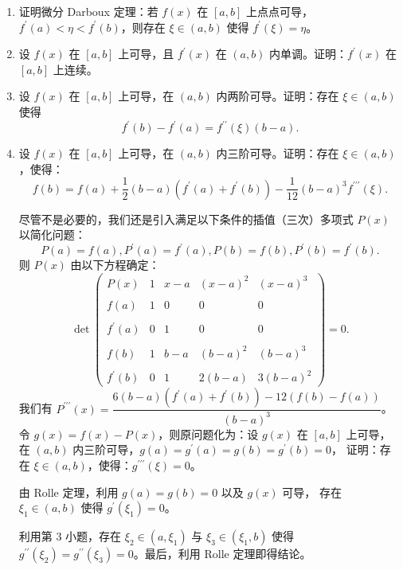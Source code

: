 \begin{enumerate}
\item 证明微分 Darboux 定理：若 $f(x)$ 在 $[a, b]$ 上点点可导，$f^{\prime}(a)<\eta<f^{\prime}(b)$，则存在 $\xi \in(a, b)$ 使得 $f^{\prime}(\xi)=\eta$。
\item 设 $f(x)$ 在 $[a, b]$ 上可导，且 $f^{\prime}(x)$ 在 $(a, b)$ 内单调。证明：$f^{\prime}(x)$ 在 $[a, b]$ 上连续。
\item 设 $f(x)$ 在 $[a, b]$ 上可导，在 $(a, b)$ 内两阶可导。证明：存在 $\xi \in(a, b)$ 使得
\[f^{\prime}(b)-f^{\prime}(a)=f^{\prime \prime}(\xi)(b-a).\]
\item 设 $f(x)$ 在 $[a, b]$ 上可导，在 $(a, b)$ 内三阶可导。证明：存在 $\xi \in(a, b)$，使得：
\[f(b)=f(a)+\frac{1}{2}(b-a)(f^{\prime}(a)+f^{\prime}(b))
-\frac{1}{12}(b-a)^{3}f^{\prime \prime \prime}(\xi).\]
\begin{proofc}[4 的证明]
尽管不是必要的，我们还是引入满足以下条件的插值（三次）多项式 $P(x)$ 以简化问题：
\[P(a)=f(a), P^{\prime}(a)=f^{\prime}(a), 
P(b)=f(b), P^{\prime}(b)=f^{\prime}(b).\]
则 $P(x)$ 由以下方程确定：
\[\det\begin{pmatrix}
P(x) & 1 & x-a & (x-a)^{2} & (x-a)^{3} \\ \\
f(a) & 1 & 0 & 0 & 0 \\ \\
f^{\prime}(a) & 0 & 1 & 0 & 0 \\ \\
f(b) & 1 & b-a & (b-a)^{2} & (b-a)^{3} \\ \\
f^{\prime}(b) & 0 & 1 & 2(b-a) & 3(b-a)^{2}
\end{pmatrix}=0.\]
我们有 $P^{\prime \prime \prime}(x)=\dfrac{6(b-a)(f^{\prime}(a)+f^{\prime}(b))-12(f(b)-f(a))}{(b-a)^{3}}$。
令 $g(x)=f(x)-P(x)$，则原问题化为：设 $g(x)$ 在 $[a, b]$ 上可导，
在 $(a, b)$ 内三阶可导，$g(a)=g^{\prime}(a)=g(b)=g^{\prime}(b)=0$，
证明：存在 $\xi \in(a, b)$，使得：$g^{\prime \prime \prime}(\xi)=0$。

由 Rolle 定理，利用 $g(a)=g(b)=0$ 以及 $g(x)$ 可导，
存在 $\xi_{1} \in(a, b)$ 使得 $g^{\prime}(\xi_{1})=0$。

利用第 3 小题，存在 $\xi_{2}\in(a, \xi_{1})$ 与 $\xi_{3}\in(\xi_{1}, b)$ 
使得 $g^{\prime \prime}(\xi_{2})=g^{\prime \prime}(\xi_{3})=0$。最后，利用 Rolle 定理即得结论。
\end{proofc}
\end{enumerate}

